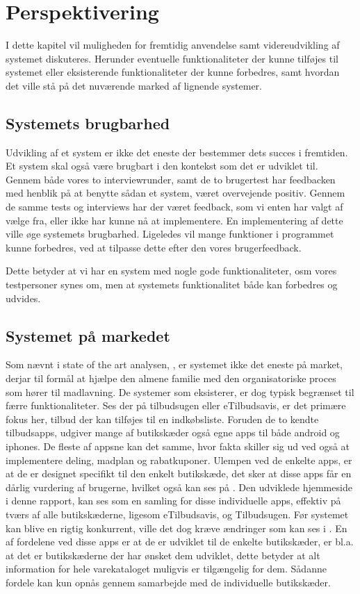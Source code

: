 \chapter{Perspektivering}
I dette kapitel vil muligheden for fremtidig anvendelse samt videreudvikling af systemet diskuteres.
Herunder eventuelle funktionaliteter der kunne tilføjes til systemet eller eksisterende funktionaliteter der kunne forbedres, samt hvordan det ville stå på det nuværende marked af lignende systemer.

\section{Systemets brugbarhed}
Udvikling af et system er ikke det eneste der bestemmer dets succes i fremtiden.
Et system skal også være brugbart i den kontekst som det er udviklet til.
Gennem både vores to interviewrunder, samt de to brugertest har feedbacken med henblik på at benytte sådan et system, været overvejende positiv.
Gennem de samme tests og interviews har der været feedback, som vi enten har valgt af vælge fra, eller ikke har kunne nå at implementere.
En implementering af dette ville øge systemets brugbarhed.
Ligeledes vil mange funktioner i programmet kunne forbedres, ved at tilpasse dette efter den vores brugerfeedback. 

Dette betyder at vi har en system med nogle gode funktionaliteter, osm vores testpersoner synes om, men at systemets funktionalitet både kan forbedres og udvides.

\section{Systemet på markedet}
Som nævnt i state of the art analysen, , er systemet ikke det eneste på market, derjar til formål at hjælpe den almene familie med den organisatoriske proces som hører til madlavning.
De systemer som eksisterer, er dog typisk begrænset til færre funktionaliteter.
Ses der på tilbudsugen eller eTilbudsavis, er det primære fokus her, tilbud der kan tilføjes til en indkøbsliste.
Foruden de to kendte tilbudsapps, udgiver mange af butikskæder også egne apps til både android og iphones.
De fleste af appsne kan det samme, hvor fakta skiller sig ud ved også at implementere deling, madplan og rabatkuponer.
Ulempen ved de enkelte apps, er at de er designet specifikt til den enkelt butikskæde, det sker at disse apps får en dårlig vurdering af brugerne, hvilket også kan ses på .
Den udviklede hjemmeside i denne rapport, kan ses som en samling for disse individuelle apps, effektiv på tværs af alle butikskæderne, ligesom eTilbudsavis, og Tilbudsugen.
Før systemet kan blive en rigtig konkurrent, ville det dog kræve ændringer som kan ses i .
En af fordelene ved disse apps er at de er udviklet til de enkelte butikskæder, er bl.a. at det er butikskæderne der har ønsket dem udviklet, dette betyder at alt information for hele varekataloget muligvis er tilgængelig for dem.
Sådanne fordele kan kun opnås gennem samarbejde med de individuelle butikskæder.

